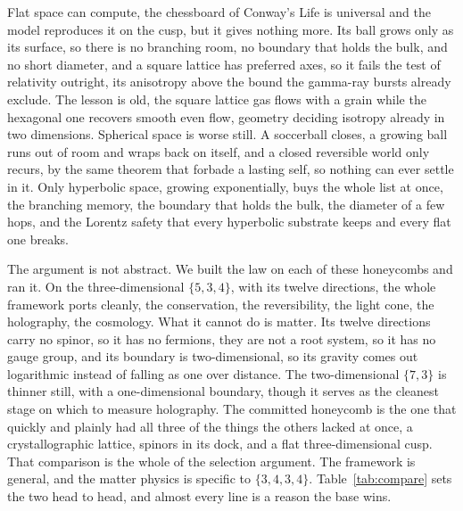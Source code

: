 Flat space can compute, the chessboard of Conway's Life is universal and the model reproduces it on the cusp, but it gives nothing more. Its ball grows only as its surface, so there is no branching room, no boundary that holds the bulk, and no short diameter, and a square lattice has preferred axes, so it fails the test of relativity outright, its anisotropy above the bound the gamma-ray bursts already exclude. The lesson is old, the square lattice gas flows with a grain while the hexagonal one recovers smooth even flow, geometry deciding isotropy already in two dimensions. Spherical space is worse still. A soccerball closes, a growing ball runs out of room and wraps back on itself, and a closed reversible world only recurs, by the same theorem that forbade a lasting self, so nothing can ever settle in it. Only hyperbolic space, growing exponentially, buys the whole list at once, the branching memory, the boundary that holds the bulk, the diameter of a few hops, and the Lorentz safety that every hyperbolic substrate keeps and every flat one breaks.

The argument is not abstract. We built the law on each of these honeycombs and ran it. On the three-dimensional $\{5,3,4\}$, with its twelve directions, the whole framework ports cleanly, the conservation, the reversibility, the light cone, the holography, the cosmology. What it cannot do is matter. Its twelve directions carry no spinor, so it has no fermions, they are not a root system, so it has no gauge group, and its boundary is two-dimensional, so its gravity comes out logarithmic instead of falling as one over distance. The two-dimensional $\{7,3\}$ is thinner still, with a one-dimensional boundary, though it serves as the cleanest stage on which to measure holography. The committed honeycomb is the one that quickly and plainly had all three of the things the others lacked at once, a crystallographic lattice, spinors in its dock, and a flat three-dimensional cusp. That comparison is the whole of the selection argument. The framework is general, and the matter physics is specific to $\{3,4,3,4\}$. Table~\ref{tab:compare} sets the two head to head, and almost every line is a reason the base wins.

